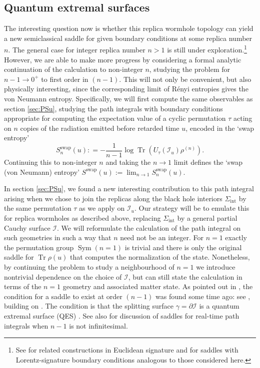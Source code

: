 \documentclass[letterpaper,12pt]{article}
\DeclareMathOperator{\Tr}{Tr}
\DeclareMathOperator{\Sym}{Sym}
\newcommand*{\scri}{\mathscr{I}} %
\newcommand*{\island}{\mathcal{I}}
\begin{document}
\subsection{Quantum extremal surfaces}\label{sec:QES}

The interesting question now is whether this replica wormhole topology can yield a new semiclassical saddle for given boundary conditions at some replica number $n$.  The general case for integer replica number $n >1$ is still under exploration.\footnote{See \cite{Faulkner:2013yia,Hartman:2013mia,Lewkowycz:2013nqa,Penington:2019kki,Mirbabayi:2020fyk} for related constructions in Euclidean signature and \cite{CDMRW} for saddles with Lorentz-signature boundary conditions analogous to those considered here.}  However, we are able to make more progress by considering a formal analytic continuation of the calculation to non-integer $n$, studying the problem for $n-1 \to 0^+$ to first order in $(n-1)$. This will not only be convenient, but also physically interesting, since the corresponding limit of R\'enyi entropies gives the von Neumann entropy. Specifically, we will first compute the same observables as section \ref{sec:PSu}, studying the path integrals with boundary conditions appropriate for computing the expectation value of a cyclic permutation $\tau$ acting on $n$ copies of the radiation emitted before retarded time $u$, encoded in the `swap entropy'
\begin{equation}
\label{eq:SwapEnt2}
S_n^{\text{swap}}(u) : = -\frac{1}{n-1} \log \Tr \left( U_\tau(\scri_u) \rho^{(n)} \right).
\end{equation}
Continuing this to non-integer $n$ and taking the $n\to 1$ limit defines the `swap (von Neumann) entropy' $S^{\text{swap}}(u) := \lim_{n\to 1} S_n^{\text{swap}}(u)$.

In section \ref{sec:PSu}, we found a new interesting contribution to this path integral arising when we chose to join the replicas along the black hole interiors $\Sigma_\mathrm{int}$ by the same permutation $\tau$ as we apply on $\scri_u$. Our strategy will be to emulate this for replica wormholes as described above, replacing $\Sigma_\mathrm{int}$ by a general partial Cauchy surface $\island$. We will reformulate the calculation of the path integral on such geometries in such a way that $n$ need not be an integer. For $n=1$ exactly the permutation group $\Sym(n=1)$ is trivial and there is only the original saddle for $\Tr\rho(u)$ that computes the normalization of the state. Nonetheless, by continuing the problem to study a neighbourhood of $n=1$  we introduce nontrivial dependence on the choice of $\island$, but can still state the calculation in terms of the $n=1$ geometry and associated matter state. As pointed out in \cite{Almheiri:2019qdq,Penington:2019kki}, the condition for a saddle to exist at order $(n-1)$ was found some time ago: see \cite{Dong:2017xht}, building on \cite{Faulkner:2013ana,Dong:2016hjy}.  The condition is that the splitting surface $\gamma=\partial\island$ is a quantum extremal surface (QES) \cite{Engelhardt:2014gca}. See also \cite{CDMRW} for discussion of saddles  for real-time path integrals when $n-1$ is not infinitesimal.
\end{document}
